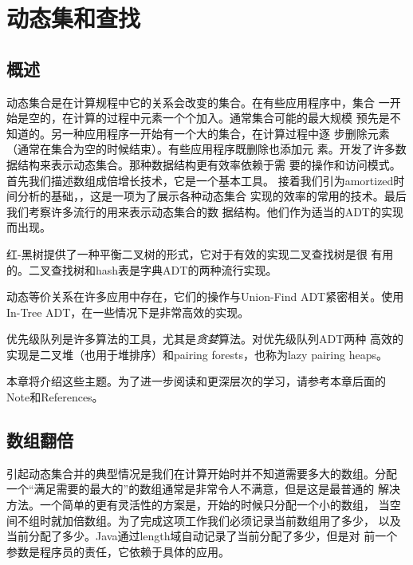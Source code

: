 \chapter{动态集和查找}\label{Sec:Chapter:DynamicSetAndSearch}
\section{概述}
动态集合是在计算规程中它的关系会改变的集合。在有些应用程序中，集合
一开始是空的，在计算的过程中元素一个个加入。通常集合可能的最大规模
预先是不知道的。另一种应用程序一开始有一个大的集合，在计算过程中逐
步删除元素（通常在集合为空的时候结束）。有些应用程序既删除也添加元
素。开发了许多数据结构来表示动态集合。那种数据结构更有效率依赖于需
要的操作和访问模式。首先我们描述数组成倍增长技术，它是一个基本工具。
接着我们引为amortized时间分析的基础，，这是一项为了展示各种动态集合
实现的效率的常用的技术。最后我们考察许多流行的用来表示动态集合的数
据结构。他们作为适当的ADT的实现而出现。

红-黑树提供了一种平衡二叉树的形式，它对于有效的实现二叉查找树是很
有用的。二叉查找树和hash表是字典ADT的两种流行实现。

动态等价关系在许多应用中存在，它们的操作与Union-Find
ADT紧密相关。使用In-Tree ADT，在一些情况下是非常高效的实现。

优先级队列是许多算法的工具，尤其是\emph{贪婪}算法。对优先级队列ADT两种
高效的实现是二叉堆（也用于堆排序）和pairing
forests，也称为lazy pairing heaps。

本章将介绍这些主题。为了进一步阅读和更深层次的学习，请参考本章后面的
Note和References。


\section{数组翻倍}\label{Sec:ArrayDoubleSize}
引起动态集合并的典型情况是我们在计算开始时并不知道需要多大的数组。分配
一个“满足需要的最大的”的数组通常是非常令人不满意，但是这是最普通的
解决方法。一个简单的更有灵活性的方案是，开始的时候只分配一个小的数组，
当空间不组时就加倍数组。为了完成这项工作我们必须记录当前数组用了多少，
以及当前分配了多少。Java通过length域自动记录了当前分配了多少，但是对
前一个参数是程序员的责任，它依赖于具体的应用。


